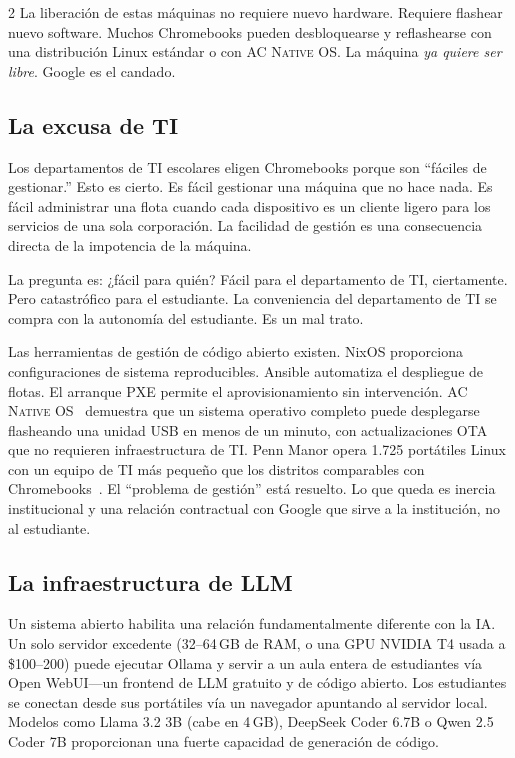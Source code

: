 \documentclass[11pt, a4paper]{article}
\newcommand{\acos}{\textsc{AC Native OS}}
\begin{document}
\begin{multicols}{2}
La liberación de estas máquinas no requiere nuevo hardware. Requiere flashear nuevo software. Muchos Chromebooks pueden desbloquearse y reflashearse con una distribución Linux estándar o con \acos{}. La máquina \emph{ya quiere ser libre}. Google es el candado.

\subsection{La excusa de TI}

Los departamentos de TI escolares eligen Chromebooks porque son ``fáciles de gestionar.'' Esto es cierto. Es fácil gestionar una máquina que no hace nada. Es fácil administrar una flota cuando cada dispositivo es un cliente ligero para los servicios de una sola corporación. La facilidad de gestión es una consecuencia directa de la impotencia de la máquina.

La pregunta es: ¿fácil para quién? Fácil para el departamento de TI, ciertamente. Pero catastrófico para el estudiante. La conveniencia del departamento de TI se compra con la autonomía del estudiante. Es un mal trato.

Las herramientas de gestión de código abierto existen. NixOS proporciona configuraciones de sistema reproducibles. Ansible automatiza el despliegue de flotas. El arranque PXE permite el aprovisionamiento sin intervención. \acos{}~\citep{scudder2026acos} demuestra que un sistema operativo completo puede desplegarse flasheando una unidad USB en menos de un minuto, con actualizaciones OTA que no requieren infraestructura de TI. Penn Manor opera 1.725 portátiles Linux con un equipo de TI más pequeño que los distritos comparables con Chromebooks~\citep{pennmanor2024linux}. El ``problema de gestión'' está resuelto. Lo que queda es inercia institucional y una relación contractual con Google que sirve a la institución, no al estudiante.

\subsection{La infraestructura de LLM}

Un sistema abierto habilita una relación fundamentalmente diferente con la IA. Un solo servidor excedente (32--64\,GB de RAM, o una GPU NVIDIA T4 usada a \$100--200) puede ejecutar Ollama y servir a un aula entera de estudiantes vía Open WebUI---un frontend de LLM gratuito y de código abierto. Los estudiantes se conectan desde sus portátiles vía un navegador apuntando al servidor local. Modelos como Llama 3.2 3B (cabe en 4\,GB), DeepSeek Coder 6.7B o Qwen 2.5 Coder 7B proporcionan una fuerte capacidad de generación de código.


\end{multicols}
\end{document}
